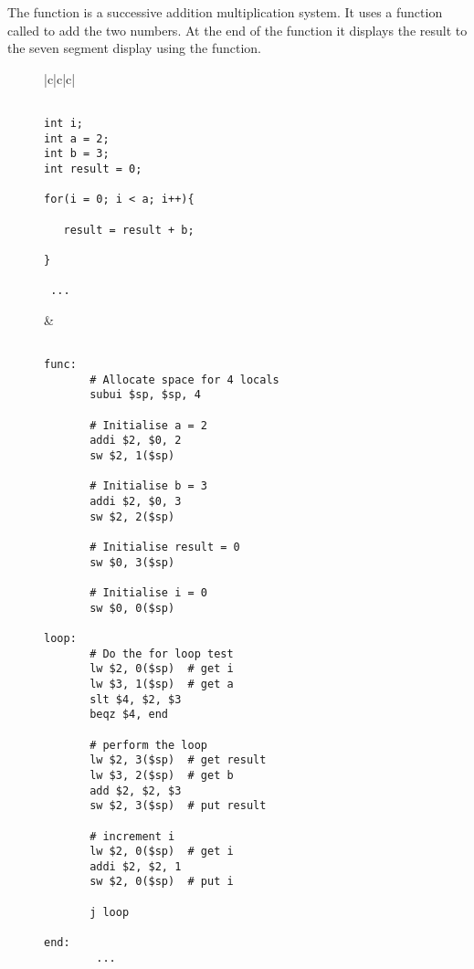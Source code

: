 The function is a successive addition multiplication system. It uses a
function called  to add the two numbers. At the end of the
function it displays the result to the seven segment display using the
 function.

%
%
\begin{figure}[!hbtp]
\begin{center}
\begin{tabular}{|c|c|c|}
\hline
\begin{minipage}[t]{5cm}
\begin{scriptsize}
\begin{verbatim}

int i;
int a = 2;
int b = 3;
int result = 0;

for(i = 0; i < a; i++){

   result = result + b;

}

 ...

\end{verbatim}
\end{scriptsize}
\end{minipage}
&
\begin{minipage}[t]{6cm}
\begin{scriptsize}
\begin{verbatim}

func:
       # Allocate space for 4 locals
       subui $sp, $sp, 4

       # Initialise a = 2
       addi $2, $0, 2
       sw $2, 1($sp)

       # Initialise b = 3
       addi $2, $0, 3
       sw $2, 2($sp)

       # Initialise result = 0
       sw $0, 3($sp)

       # Initialise i = 0
       sw $0, 0($sp)

loop:
       # Do the for loop test
       lw $2, 0($sp)  # get i
       lw $3, 1($sp)  # get a
       slt $4, $2, $3
       beqz $4, end

       # perform the loop
       lw $2, 3($sp)  # get result
       lw $3, 2($sp)  # get b
       add $2, $2, $3
       sw $2, 3($sp)  # put result

       # increment i
       lw $2, 0($sp)  # get i
       addi $2, $2, 1
       sw $2, 0($sp)  # put i

       j loop

end:
        ...


\end{verbatim}
\end{scriptsize}
\end{minipage}
\end{tabular}
\end{center}
\end{figure}
